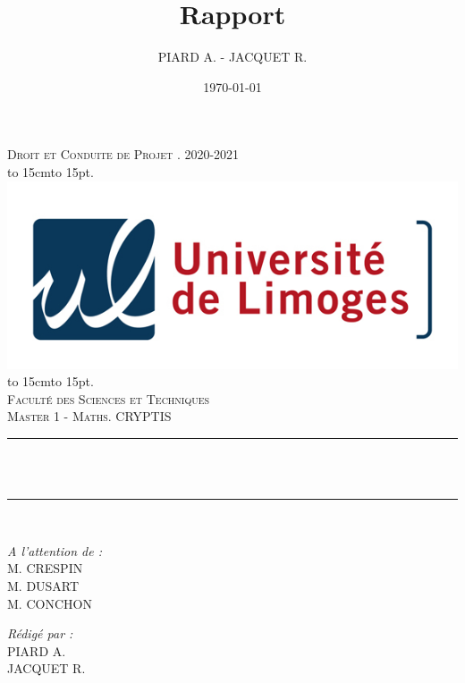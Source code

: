 \documentclass[12pt]{article}
\title{Rapport}
\author{PIARD A. - JACQUET R.}
\date{\today}
\makeatletter
\let\thetitle\@title
\def\dotfill#1{\cleaders\hbox to #1{.}\hfill}
\newcommand\dotline[2][.5em]{\leavevmode\hbox to #2{\dotfill{#1}\hfil}}
\makeatother
\begin{document}
\begin{titlepage}
	\centering
    \vspace*{0.5 cm}
    \textsc{\LARGE Droit et Conduite de Projet . 2020-2021}\\[1.0 cm]
    \dotline[15pt]{15cm}\\
	\includegraphics[scale = 2.2]{logo.png}
	\dotline[15pt]{15cm}\\
	\vspace{1.5cm}
	\textsc{\Large Faculté des Sciences et Techniques}\\
	\textsc{\large Master 1 - Maths. CRYPTIS}\\[1.0 cm]
	\rule{\linewidth}{0.2 mm} \\[0.4 cm]
	{ \huge \bfseries \color{blue} \thetitle}\\
	\rule{\linewidth}{0.2 mm} \\[1.5 cm]
	
	\begin{minipage}{0.4\textwidth}
		\begin{flushleft} \large
			\emph{A l'attention de :}\\
			M. CRESPIN\\
			M. DUSART\\
			M. CONCHON\\
		\end{flushleft}
	\end{minipage}
	\begin{minipage}{0.5\textwidth}
    	\begin{flushright} \large
		\emph{Rédigé par :}\\
		PIARD A.\\
		JACQUET R.\\
		\phantom{a}\\
		\end{flushright}
	\end{minipage}\\[2 cm]
\end{titlepage}
\end{document}
